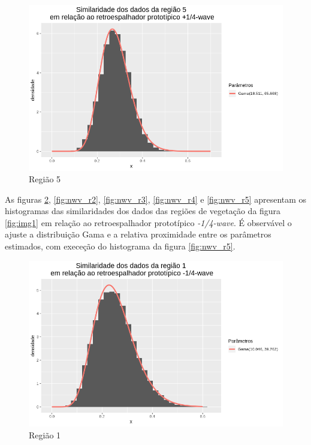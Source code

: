 \documentclass[12pt]{article}
\begin{document}
\begin{figure}[!h]
    \centering
    \vspace{0.1\linewidth}
    \includegraphics[width = \linewidth]{../../Images/Report_18_12_20/pwv_region5.png}
    \caption{Região 5}
    \label{fig:pwv_r5}
\end{figure}

As figuras \ref{fig:nwv_r1}, \ref{fig:nwv_r2}, \ref{fig:nwv_r3}, \ref{fig:nwv_r4} e \ref{fig:nwv_r5} apresentam os histogramas das similaridades dos dados das regiões de vegetação da figura \ref{fig:img1} em relação ao retroespalhador prototípico \textit{-1/4-wave}. É observável o ajuste a distribuição Gama e a relativa proximidade entre os parâmetros estimados, com execeção do histograma da figura \ref{fig:nwv_r5}.

\begin{figure}[!h]
    \centering
    \includegraphics[width = \linewidth]{../../Images/Report_18_12_20/nwv_region1.png}
    \caption{Região 1}
    \label{fig:nwv_r1}
\end{figure}
\end{document}
